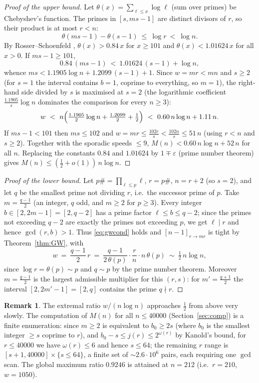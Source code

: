 \documentclass[11pt]{article}
\theoremstyle{definition}
\newtheorem{remark}[theorem]{Remark}
\begin{document}
\begin{proof}[Proof of the upper bound]
Let $\theta(x)=\sum_{\ell\le x}\log \ell$ (sum over primes) be Chebyshev's
function. The primes in $[s,ms-1]$ are distinct divisors of $r$, so their
product is at most $r<n$:
\[
\theta(ms-1)-\theta(s-1)\ \le\ \log r\ <\ \log n .
\]
By Rosser--Schoenfeld \cite{RS62}, $\theta(x)>0.84\,x$ for $x\ge101$ and
$\theta(x)<1.01624\,x$ for all $x>0$. If $ms-1\ge101$,
\[
0.84\,(ms-1)\ <\ 1.01624\,(s-1)+\log n,
\]
whence $ms<1.1905\log n+1.2099\,(s-1)+1$. Since $w=mr<mn$ and
$s\ge2$ (for $s=1$ the interval contains $b=1$, coprime to everything, so
$m=1$), the right-hand side divided by $s$ is maximised at $s=2$ (the
logarithmic coefficient $\frac{1.1905}{s}\log n$ dominates the comparison
for every $n\ge3$):
\[
w\ <\ n\Bigl(\tfrac{1.1905}{2}\log n+\tfrac{1.2099}{2}+\tfrac12\Bigr)
\ <\ 0.60\,n\log n+1.11\,n .
\]
If $ms-1<101$ then $ms\le102$ and $w=mr\le\frac{102r}{s}<\frac{102n}{s}\le
51\,n$ (using $r<n$ and $s\ge2$). Together with
the sporadic speeds $\le9$, $M(n)<0.60\,n\log n+52\,n$ for all $n$.
Replacing the constants $0.84$ and $1.01624$ by $1\mp\varepsilon$ (prime
number theorem) gives $M(n)\le(\frac12+o(1))\,n\log n$.
\end{proof}

\begin{proof}[Proof of the lower bound]
Let $p\#=\prod_{\ell\le p}\ell$, $r=p\#$, $n=r+2$ (so $s=2$), and let $q$
be the smallest prime not dividing $r$, i.e.\ the successor prime of $p$.
Take $m=\frac{q-1}{2}$ (an integer, $q$ odd, and $m\ge2$ for $p\ge3$). Every
integer $b\in[2,2m-1]=[2,q-2]$ has a prime factor $\ell\le b\le q-2$; since
the primes not exceeding $q-2$ are exactly the primes not exceeding $p$, we
get $\ell\mid r$ and hence $\gcd(r,b)>1$. Thus \eqref{eq:gwcond} holds and
$[n-1]_{r\to mr}$ is tight by Theorem~\ref{thm:GW}, with
\[
w\ =\ \frac{q-1}{2}\,r
\ =\ \frac{q-1}{2\,\theta(p)}\cdot\frac{r}{n}\cdot n\,\theta(p)
\ \sim\ \tfrac12\,n\log n,
\]
since $\log r=\theta(p)\sim p$ and $q\sim p$ by the prime number theorem.
Moreover $m=\frac{q-1}{2}$ is the largest admissible multiplier for this
$(r,s)$: for $m'=\frac{q+1}{2}$ the interval $[2,2m'-1]=[2,q]$ contains the
prime $q\nmid r$.
\end{proof}

\begin{remark}
The extremal ratio $w/(n\log n)$ approaches $\frac12$ from above very
slowly.  The computation of $M(n)$ for all $n\le40000$
(Section~\ref{sec:comp}) is a finite enumeration: since $m\ge2$ is
equivalent to $b_0\ge2s$ (where $b_0$ is the smallest integer $\ge s$
coprime to $r$), and $b_0-s\le j(r)\le 2^{\omega(r)}$ by Kanold's bound,
for $r\le40000$ we have $\omega(r)\le6$ and hence $s\le64$; the remaining
$r$ range is $[s+1,40000]\times\{s\le64\}$, a finite set of
${\sim}2.6\cdot10^6$ pairs, each requiring one $\gcd$ scan.  The global
maximum ratio $0.9246$ is attained at $n=212$ (i.e.\ $r=210$, $w=1050$).
\end{remark}
\end{document}
